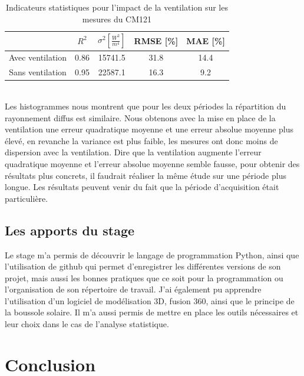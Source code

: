 \documentclass[12pt,a4paper]{article}
\begin{document}
\begin{flushleft}
\begin{table}[H]
\begin{center}
\begin{tabular}{ |c|c|c|c|c| } 
 \hline
  & $R^2$ & $\sigma ^2 [\frac{W^2}{m^4}]$ & RMSE [\%] & MAE [\%] \\ 
  \hline
 Avec ventilation & 0.86 & 15741.5 & 31.8 & 14.4\\ 
 \hline
 Sans ventilation & 0.95 & 22587.1 & 16.3 & 9.2 \\ 
 \hline
\end{tabular}
\caption{Indicateurs statistiques pour l'impact de la ventilation sur les mesures du CM121}
\end{center}
\end{table}

~\\
Les histogrammes nous montrent que pour les deux périodes la répartition du rayonnement diffus est similaire.
Nous obtenons avec la mise en place de la ventilation une erreur quadratique moyenne et une erreur absolue moyenne plus élevé, en revanche la variance est plus faible, les mesures ont donc moins de dispersion avec la ventilation. Dire que la ventilation augmente l'erreur quadratique moyenne et l'erreur absolue moyenne semble fausse, pour obtenir des résultats plus concrets, il faudrait réaliser la même étude sur une période plus longue. Les résultats peuvent venir du fait que la période d'acquisition était particulière.

\subsection{Les apports du stage}

Le stage m'a permis de découvrir le langage de programmation Python, ainsi que l'utilisation de github qui permet d'enregistrer les différentes versions de son projet, mais aussi les bonnes pratiques que ce soit pour la programmation ou l'organisation de son répertoire de travail. J'ai également pu apprendre l'utilisation d'un logiciel de modélisation 3D, fusion 360, ainsi que le principe de la boussole solaire. Il m'a aussi permis de mettre en place les outils nécessaires et leur choix dans le cas de l'analyse statistique.


\section{Conclusion}


\end{flushleft}
\end{document}
